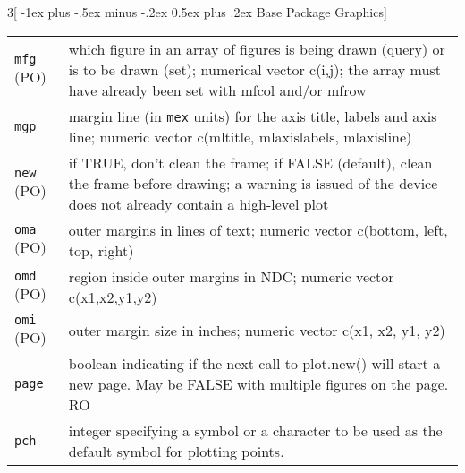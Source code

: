 \documentclass[landscape]{article}
\makeatletter
\renewcommand{\section}{\@startsection{section}{1}{0mm}%
                                {-1ex plus -.5ex minus -.2ex}%
                                {0.5ex plus .2ex}%
                                {\normalfont\large\bfseries}}
\makeatother
\begin{document}
\begin{multicols}{3}[\section{Base Package Graphics}]
\begin{tabular}[t]{@{}p{\widthleftcol}p{\widthrightcol}@{}}
\verb|mfg| (PO) & which figure in an array of figures is being drawn (query) or is to be drawn (set); numerical vector c(i,j); the array must have already been set with mfcol and/or mfrow \\
\verb|mgp| & margin line (in \verb|mex| units) for the axis title, labels and axis line; numeric vector c(mltitle, mlaxislabels, mlaxisline) \\
\verb|new| (PO) & if TRUE, don't clean the frame; if FALSE (default), clean the frame before drawing; a warning is issued of the device does not already contain a high-level plot \\
\verb|oma| (PO) & outer margins in lines of text; numeric vector c(bottom, left, top, right) \\
\verb|omd| (PO) & region inside outer margins in NDC; numeric vector c(x1,x2,y1,y2) \\
\verb|omi| (PO) & outer margin size in inches; numeric vector c(x1, x2, y1, y2) \\
\verb|page| & boolean indicating if the next call to plot.new() will start  a new page. May be FALSE with multiple figures on the page. RO \\
\verb|pch| & integer specifying a symbol or a character to be used as the default symbol for plotting points. \\
\hline 
\end{tabular}


\end{multicols}
\end{document}
